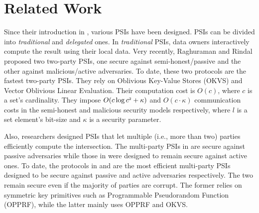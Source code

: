 
\vs


\section{Related Work}\label{sec::related-work}


Since their introduction in \cite{DBLP:conf/eurocrypt/FreedmanNP04}, various PSIs have been designed. PSIs can be divided into \textit{traditional} and \textit{delegated} ones.   
%
In \textit{traditional} PSIs, data owners interactively compute the result using their local data. 
%
Very recently, Raghuraman and Rindal \cite{RaghuramanR22} proposed two two-party PSIs, one secure against semi-honest/passive and the other against malicious/active adversaries. To date, these two protocols are the fastest two-party PSIs. They rely on  Oblivious Key-Value Stores (OKVS)  and Vector Oblivious Linear Evaluation. Their  computation cost is $O(c)$, where $c$ is  a set's cardinality.  They impose $O(c\log c^{\scriptscriptstyle 2}+\kappa)$ and $O(c\cdot \kappa)$ communication costs in the semi-honest and malicious security models respectively, where $l$ is a set element's bit-size and  $\kappa$ is a security parameter.  

Also, researchers designed PSIs that let multiple (i.e., more than two) parties efficiently compute the intersection. The multi-party PSIs in  \cite{DBLP:conf/scn/InbarOP18,DBLP:conf/ccs/KolesnikovMPRT17} are secure against  passive adversaries while those in \cite{Ben-EfraimNOP21,GhoshN19,ZhangLLJL19,DBLP:conf/ccs/KolesnikovMPRT17,NevoTY21} were designed to remain secure against  active ones.  To date, the  protocols  in   \cite{DBLP:conf/ccs/KolesnikovMPRT17} and  \cite{NevoTY21} are the most  efficient multi-party PSIs  designed to be  secure against passive and active  adversaries respectively. The two remain secure even if the majority of parties are corrupt.  
%
%
The former relies on symmetric key primitives such as  Programmable Pseudorandom Function (OPPRF), while the latter mainly uses OPPRF and OKVS. 

